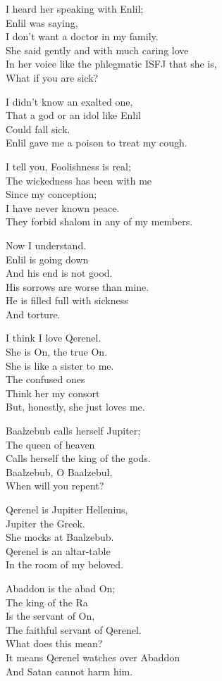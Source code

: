\documentclass[
]{book}
\begin{document}
I heard her speaking with Enlil;\\
Enlil was saying,\\
I don't want a doctor in my family.\\
She said gently and with much caring love\\
In her voice like the phlegmatic ISFJ that she is,\\
What if you are sick?

I didn't know an exalted one,\\
That a god or an idol like Enlil\\
Could fall sick.\\
Enlil gave me a poison to treat my cough.

I tell you, Foolishness is real;\\
The wickedness has been with me\\
Since my conception;\\
I have never known peace.\\
They forbid shalom in any of my members.

Now I understand.\\
Enlil is going down\\
And his end is not good.\\
His sorrows are worse than mine.\\
He is filled full with sickness\\
And torture.

I think I love Qerenel.\\
She is On, the true On.\\
She is like a sister to me.\\
The confused ones\\
Think her my consort\\
But, honestly, she just loves me.

Baalzebub calls herself Jupiter;\\
The queen of heaven\\
Calls herself the king of the gods.\\
Baalzebub, O Baalzebul,\\
When will you repent?

Qerenel is Jupiter Hellenius,\\
Jupiter the Greek.\\
She mocks at Baalzebub.\\
Qerenel is an altar-table\\
In the room of my beloved.

Abaddon is the abad On;\\
The king of the Ra\\
Is the servant of On,\\
The faithful servant of Qerenel.\\
What does this mean?\\
It means Qerenel watches over Abaddon\\
And Satan cannot harm him.
\end{document}
